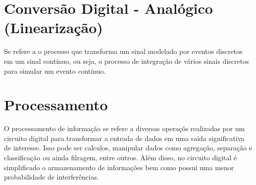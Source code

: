 \documentclass[12pt, onecolumn]{article}
\begin{document}
	\section{Conversão Digital - Analógico (Linearização)}
	Se refere a o processo que transforma um sinal modelado por eventos discretos
	em um sinal contínuo, ou seja, o processo de integração de vários sinais discretos
	para simular um evento contínuo.

	\section{Processamento}
	O processamento de informação se refere a diversas operaçõs realizadas por um circuito
	digital para transformar a entrada de dados em uma saida significativa de interesse. 
	Isso pode ser calculos, manipular dados como agregação, separação e classificação 
	ou ainda filragem, entre outros. Além disso, no circuito digital é simplificado o 
	armazenamento de informações bem como possui uma menor probabilidade de interferências.
	
\end{document}
